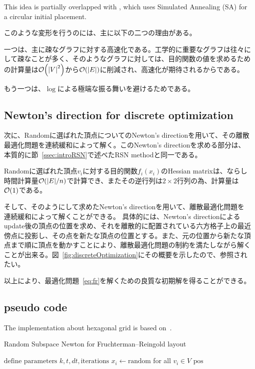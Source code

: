 \documentclass[dvipdfmx,journal]{IEEEtran}
\begin{document}
This idea is partially overlapped with \cite{ghassemitoosiSimulatedAnnealingPreProcessing2016,s22145179}, which uses Simulated Annealing (SA) for a circular initial placement.

このような変形を行うのには、主に以下の二つの理由がある。

一つは、主に疎なグラフに対する高速化である。工学的に重要なグラフは往々にして疎なことが多く、そのようなグラフに対しては、目的関数の値を求めるための計算量は$\order{\abs{V}^2}$から$\order{\abs{E}}$に削減され、高速化が期待されるからである。

もう一つは、$\log$による極端な振る舞いを避けるためである。

\subsection{Newton's direction for discrete optimization}\label{ssec:newtonDirection}

次に、Randomに選ばれた頂点についてのNewton's directionを用いて、その離散最適化問題を連続緩和によって解く。このNewton's directionを求める部分は、本質的に節~\ref{ssec:introRSN}で述べたRSN methodと同一である。

Randomに選ばれた頂点$v_i$に対する目的関数$f_i(x_i)$のHessian matrixは、ならし時間計算量$\order{\abs{E}/n}$で計算でき、またその逆行列は$2 \times 2$行列の為、計算量は$\order{1}$である。

そして、そのようにして求めたNewton's directionを用いて、離散最適化問題を連続緩和によって解くことができる。
具体的には、Newton's directionによるupdate後の頂点の位置を求め、それを離散的に配置されている六方格子上の最近傍点に投影し、その点を新たな頂点の位置とする。また、元の位置から新たな頂点まで順に頂点を動かすことにより、離散最適化問題の制約を満たしながら解くことが出来る。図~\ref{fig:discreteOptimization}にその概要を示したので、参照されたい。

以上により、最適化問題~\eqref{eq:fr}を解くための良質な初期解を得ることができる。

\subsection{pseudo code}\label{ssec:pseudoCode}

The implementation about hexagonal grid is based on~\cite{patelHexagonalGrids2013}.

\begin{algorithm}[ht]
  \caption{Random Subspace Newton for Fruchterman--Reingold layout}
  \label{alg:rsn}

  $\text{define parameters } k, t, dt, \text{iterations}$\;
  $x_i \gets \text{random}$ for all $v_i \in V$\;
  \Return $\text{pos}$
\end{algorithm}
\end{document}
